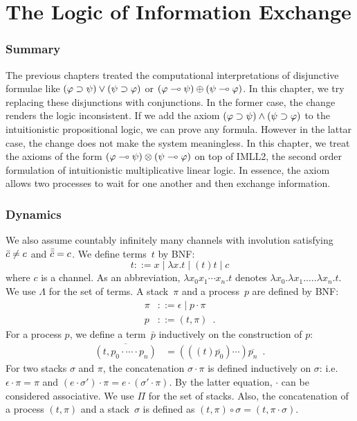 \chapter{The Logic of Information Exchange}
\label{ch:exchange}

\subsection{Summary}

The previous chapters treated the computational interpretations of
disjunctive formulae like $(\varphi\supset\psi)\lor(\psi\supset\varphi)$ or
$(\varphi\multimap\psi)\oplus(\psi\multimap\varphi)$.  In this chapter, we try
replacing these disjunctions with conjunctions.
In the former case, the change renders the logic inconsistent.
If we add the axiom $(\varphi\supset\psi)\land(\psi\supset\varphi)$ to the
intuitionistic propositional logic,
we can prove any formula.  However in the lattar case, the change does
not make the system meaningless.
In this chapter, we treat
the axioms of the form $(\varphi\multimap\psi)\otimes(\psi\multimap\varphi)$
on top of IMLL2, the second order formulation of intuitionistic
multiplicative linear
logic.  In essence, the axiom allows two processes to wait for one
another and then exchange information.

\subsection{Dynamics}

We also assume countably infinitely many channels with involution
satisfying $\bar{c}\neq c$ and $\bar{\bar{c}} = c$.
We define terms~$t$ by BNF:
\[
 t ::= x\mid \lambda x.t\mid (t)t\mid c
\]
where $c$ is a channel.
As an abbreviation, $\lambda x_0x_1\cdots x_n.t$
denotes $\lambda x_0. \lambda x_1. \ldots . \lambda x_n.t$.
We use $\Lambda$ for the set of terms.
A stack~$\pi$ and a process~$p$
are defined by BNF:
\begin{align*}
 \pi &::= \epsilon\mid p\cdot\pi\\
 p   &::= (t,\pi)\enspace.
\end{align*}
For a process $p$, we define a term~$\bar p$ inductively on
the construction of $p$:
\begin{align*}
 \overline{(t,p_0\cdot\cdots \cdot p_n)}&= (((t)\overline{p_0})\cdots)\overline{p_n}\enspace.
\end{align*}
For two stacks $\sigma$ and $\pi$, the concatenation $\sigma\cdot\pi$ is
defined
inductively on $\sigma$: i.e. $\epsilon\cdot\pi = \pi$ and $(e
\cdot \sigma') \cdot \pi = e\cdot (\sigma'\cdot \pi)$.  By the latter
equation, $\cdot$ can be considered associative.
We use $\Pi$ for the set of stacks.
Also, the concatenation of a process $(t,\pi)$ and a stack~$\sigma$ is
defined as $(t,\pi)\circ\sigma = (t,\pi\cdot \sigma)$.


